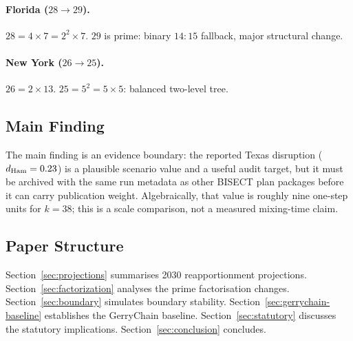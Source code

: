 \paragraph{Florida ($28 \to 29$).}
$28 = 4 \times 7 = 2^2 \times 7$.
$29$ is prime: binary $14:15$ fallback, major structural change.

\paragraph{New York ($26 \to 25$).}
$26 = 2 \times 13$.
$25 = 5^2 = 5 \times 5$: balanced two-level tree.

\subsection{Main Finding}

The main finding is an evidence boundary: the reported Texas disruption
($d_{\rm Ham}=0.23$) is a plausible scenario value and a useful audit target,
but it must be archived with the same run metadata as other BISECT plan
packages before it can carry publication weight.  Algebraically, that value is
roughly nine one-step \recom{} units for $k=38$; this is a scale comparison,
not a measured mixing-time claim.

\subsection{Paper Structure}

Section~\ref{sec:projections} summarises 2030 reapportionment projections.
Section~\ref{sec:factorization} analyses the prime factorisation changes.
Section~\ref{sec:boundary} simulates boundary stability.
Section~\ref{sec:gerrychain-baseline} establishes the GerryChain baseline.
Section~\ref{sec:statutory} discusses the statutory implications.
Section~\ref{sec:conclusion} concludes.
